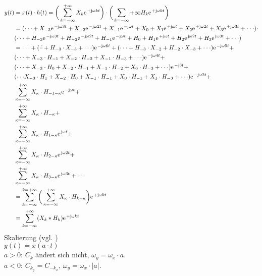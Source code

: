 \documentclass[11pt,a4paper,DIV=12]{scrartcl}
\begin{document}
\begin{align}
	y(t)&=x(t)\cdot h(t) = \bigg (\sum_{k=-\infty}^{+\infty}X_k\e^{+\im\omega k t}\bigg )\cdot\bigg (\sum_{k=-\infty}{+\infty}H_k\e^{+\im\omega k t}\bigg )\\
	&=(\cdot\cdot\cdot+X_{-3}\e^{-\im\omega 3 t}+X_{-2}\e^{-\im\omega 2 t}+X_{-1}\e^{-\im\omega t}+X_0+X_{1}\e^{+\im\omega t}+X_{2}\e^{+\im\omega 2 t}+X_{3}\e^{+\im\omega 3 t}+\cdot\cdot\cdot)\cdot\\&(\cdot\cdot\cdot +H_{-3}\e^{-\im\omega 3 t}+H_{-2}\e^{-\im\omega 2 t}+H_{-1}\e^{-\im\omega  t}+H_0+H_{1}\e^{+\im\omega  t}+H_{2}\e^{\im\omega 2 t}+H_{3}\e^{\im\omega 3 t}+\cdot\cdot\cdot)\\
	&=\cdot\cdot\cdot+(\cdot\dot\cdot+H_{-3}\cdot X_{-3}+\cdot\cdot\cdot)\e^{-\im\omega 6 t}+(\cdot\cdot\cdot+H_{-3}\cdot X_{-2}+H_{-2}\cdot X_{-3}+\cdot\cdot\cdot)\e^{-\im\omega 5 t}+\\
	&(\cdot\cdot\cdot+X_{-3}\cdot H_{-1}+X_{-2}\cdot H_{-2}+X_{-1}\cdot H_{-3}+\cdot\cdot\cdot)\e^{-\im\omega 4 t}+\\
	&(\cdot\cdot\cdot+X_{-3}\cdot H_0+X_{-2}\cdot H_{-1}+X_{-1}\cdot H_{-2}+X_0\cdot H_{-3}+\cdot\cdot\cdot)\e^{-\im 3 t}+\\
	&(\cdot\cdot\cdot X_{-3}\cdot H_1+X_{-2}\cdot H_0+X_{-1}\cdot H_{-1}+X_0\cdot H_{-1}+X_{1}\cdot H_{-3}+\cdot\cdot\cdot)\e^{-\im\omega 2 t}+\\
	&\sum_{\kappa=-\infty}^{+\infty}X_{\kappa}\cdot H_{-1-\kappa}\e^{-\im\omega t}+\\
	&\sum_{\kappa=-\infty}^{+\infty}X_{\kappa}\cdot H_{-\kappa}+\\
	&\sum_{\kappa=-\infty}^{+\infty}X_{\kappa}\cdot H_{1-\kappa}\e^{\im\omega t}+\\
	&\sum_{\kappa=-\infty}^{+\infty}X_{\kappa}\cdot H_{2-\kappa}\e^{\im\omega 2t}+\\
	&\sum_{\kappa=-\infty}^{+\infty}X_{\kappa}\cdot H_{3-\kappa}\e^{\im\omega 3t}+\cdot\cdot\cdot\\
	&=\sum_{k=-\infty}^{k=+\infty}\bigg (\sum_{\kappa=-\infty}^{+\infty}X_{\kappa}\cdot H_{k-\kappa}\bigg)\e^{+\im\omega k t}\\
	&=\sum_{k=-\infty}^{+\infty}(X_k\ast H_k) \e^{+\im\omega k t}
\end{align}
Skalierung (vgl. \cite[Kap. 1, S. 22]{Butz2012})\\
$y(t) = x(a\cdot t)$	\\
$a>0$: $C_k$ ändert sich nicht, $\omega_y = \omega_x \cdot a$.\\
$a<0$: $C_{k_y} = C_{-k_x}$, $\omega_y = \omega_x \cdot |a|$.\\
\end{document}
